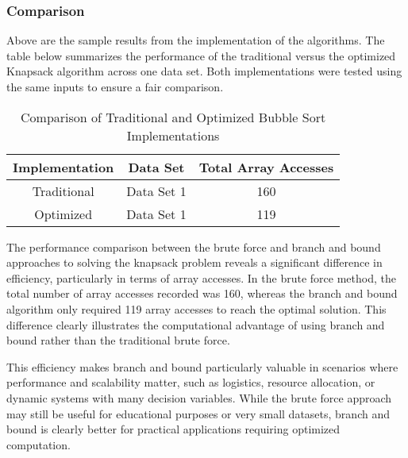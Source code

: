 \subsubsection{Comparison}


Above are the sample results from the implementation of the algorithms. The table below summarizes the performance of the traditional versus the optimized Knapsack algorithm across one data set. Both implementations were tested using the same inputs to ensure a fair comparison.

\begin{table}[h]
    \centering
    \caption{Comparison of Traditional and Optimized Bubble Sort Implementations}
    \begin{tabular}{|c|c|c|}
        \hline
        \textbf{Implementation} & \textbf{Data Set} & \textbf{Total Array Accesses} \\
        \hline
        Traditional & Data Set 1 & 160\\\hline
        Optimized   & Data Set 1& 119\\ \hline
    \end{tabular}
    \label{tab:sort_comparison}
\end{table}

The performance comparison between the brute force and branch and bound approaches to solving the knapsack problem reveals a significant difference in efficiency, particularly in terms of array accesses. In the brute force method, the total number of array accesses recorded was 160, whereas the branch and bound algorithm only required 119 array accesses to reach the optimal solution. This difference clearly illustrates the computational advantage of using branch and bound rather than the traditional brute force.

This efficiency makes branch and bound particularly valuable in scenarios where performance and scalability matter, such as logistics, resource allocation, or dynamic systems with many decision variables. While the brute force approach may still be useful for educational purposes or very small datasets, branch and bound is clearly better for practical applications requiring optimized computation.
